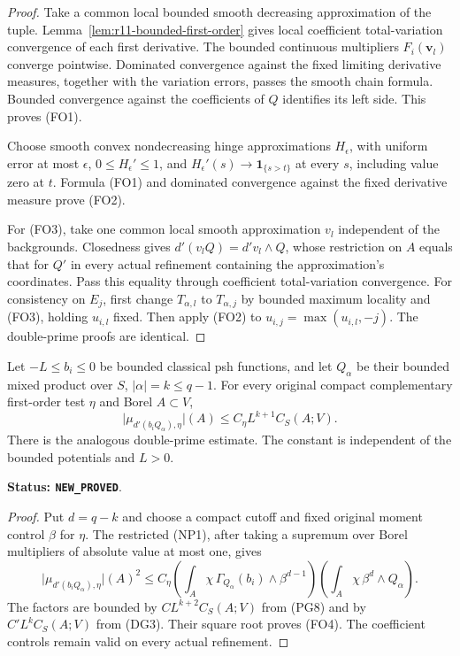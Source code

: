 \begin{proof}
Take a common local bounded smooth decreasing approximation
of the tuple. Lemma~\ref{lem:r11-bounded-first-order}
gives local coefficient total-variation convergence of each
first derivative. The bounded continuous multipliers
$F_i(\mathbf v_l)$ converge pointwise. Dominated convergence
against the fixed limiting derivative measures, together
with the variation errors, passes the smooth chain formula.
Bounded convergence against the coefficients of $Q$
identifies its left side. This proves (FO1).

Choose smooth convex nondecreasing hinge approximations
$H_\epsilon$, with uniform error at most $\epsilon$,
$0\leq H_\epsilon'\leq1$, and
$H_\epsilon'(s)\to\mathbf1_{\{s>t\}}$ at every $s$,
including value zero at $t$. Formula (FO1) and dominated
convergence against the fixed derivative measure prove (FO2).

For (FO3), take one common local smooth approximation $v_l$
independent of the backgrounds. Closedness gives
$d'(v_lQ)=d'v_l\wedge Q$, whose restriction on $A$
equals that for $Q'$ in every actual refinement containing
the approximation's coordinates. Pass this equality through
coefficient total-variation convergence.
For consistency on $E_j$, first change $T_{\alpha,l}$
to $T_{\alpha,j}$ by bounded maximum locality and (FO3),
holding $u_{i,l}$ fixed. Then apply (FO2) to
$u_{i,j}=\max(u_{i,l},-j)$. The double-prime proofs are identical.
\end{proof}

\begin{lemma}
\label{lem:r11-first-order-capacity-bound}
Let $-L\leq b_i\leq0$ be bounded classical psh functions,
and let $Q_\alpha$ be their bounded mixed product over $S$,
$|\alpha|=k\leq q-1$. For every original compact
complementary first-order test $\eta$ and Borel $A\subset V$,
\[
 \bigl|\mu_{d'(b_iQ_\alpha),\eta}\bigr|(A)
                  \leq C_\eta L^{k+1}C_S(A;V).
 \tag{FO4}
\]
There is the analogous double-prime estimate. The constant
is independent of the bounded potentials and $L>0$.
\end{lemma}

\noindent\textbf{Status: \texttt{NEW\_PROVED}}.

\begin{proof}
Put $d=q-k$ and choose a compact cutoff and fixed original
moment control $\beta$ for $\eta$. The restricted (NP1),
after taking a supremum over Borel multipliers of absolute
value at most one, gives
\[
 \bigl|\mu_{d'(b_iQ_\alpha),\eta}\bigr|(A)^2
 \leq C_\eta
       \left(\int_A\chi\,\Gamma_{Q_\alpha}(b_i)
                                  \wedge\beta^{d-1}\right)
       \left(\int_A\chi\,\beta^d\wedge Q_\alpha\right).
 \tag{FO5}
\]
The factors are bounded by $CL^{k+2}C_S(A;V)$ from
(PG8) and by $C'L^kC_S(A;V)$ from (DG3).
Their square root proves (FO4). The coefficient controls
remain valid on every actual refinement.
\end{proof}

